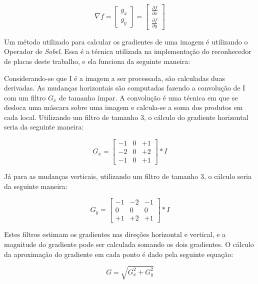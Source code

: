\begin{displaymath}
\nabla f={\begin{bmatrix}g_{x}\\g_{y}\end{bmatrix}}={\begin{bmatrix}{\frac {\partial f}{\partial x}}\\{\frac {\partial f}{\partial y}}\end{bmatrix}}
\end{displaymath}

Um método utilizado para calcular os gradientes de uma imagem é utilizando o Operador de \emph{Sobel}. Essa é a técnica utilizada na implementação do reconhecedor de placas deste trabalho, e ela funciona da seguinte maneira:

Considerando-se que I é a imagem a ser processada, são calculadas duas derivadas. As mudanças horizontais são computadas fazendo a convolução de I com um filtro $G_{x}$ de tamanho ímpar. A convolução é uma técnica em que se desloca uma máscara sobre uma imagem e calcula-se a soma dos produtos em cada local. Utilizando um filtro de tamanho 3, o cálculo do gradiente horizontal seria da seguinte maneira: 

\begin{displaymath}
G_{x} = \begin{bmatrix}
-1 & 0 & +1  \\
-2 & 0 & +2  \\
-1 & 0 & +1
\end{bmatrix} * I
\end{displaymath}

Já para as mudanças verticais, utilizando um filtro de tamanho 3, o cálculo seria da seguinte maneira:

\begin{displaymath}
G_{y} = \begin{bmatrix}
-1 & -2 & -1  \\
0 & 0 & 0  \\
+1 & +2 & +1
\end{bmatrix} * I
\end{displaymath}

Estes filtros estimam os gradientes nas direções horizontal e vertical, e a magnitude do gradiente pode ser calculada somando os dois gradientes. O cálculo da aproximação do gradiente em cada ponto é dado pela seguinte equação:

\begin{displaymath}
G = \sqrt{ G_{x}^{2} + G_{y}^{2} }
\end{displaymath}

